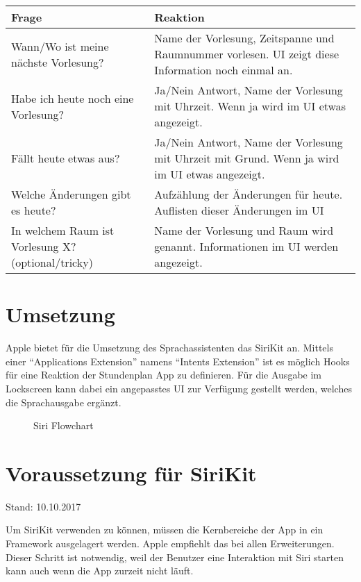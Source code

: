 \noindent%
\begin{tabularx}{\textwidth}{|p{}|X| }
\hline
\textbf{Frage} & \textbf{Reaktion}  \\ \hline 

Wann/Wo ist meine nächste Vorlesung? & Name der Vorlesung, Zeitspanne und Raumnummer vorlesen.
UI zeigt diese Information noch einmal an.\\ \hline

Habe ich heute noch eine Vorlesung? & Ja/Nein Antwort, Name der Vorlesung mit Uhrzeit. 
Wenn ja wird im UI etwas angezeigt.
\\ \hline

Fällt heute etwas aus? & Ja/Nein Antwort, Name der Vorlesung mit Uhrzeit mit Grund. 
Wenn ja wird im UI etwas angezeigt.\\ \hline
Welche Änderungen gibt es heute? & Aufzählung der Änderungen für heute.
Auflisten dieser Änderungen im UI\\ \hline
In welchem Raum ist Vorlesung X? (optional/tricky) & Name der Vorlesung und Raum wird genannt.
Informationen im UI werden angezeigt.
\\ \hline

\end{tabularx}

\section{Umsetzung}
Apple bietet für die Umsetzung des Sprachassistenten das SiriKit an. Mittels einer “Applications Extension” namens “Intents Extension” ist es möglich Hooks für eine Reaktion der Stundenplan App zu definieren. Für die Ausgabe im Lockscreen kann dabei ein angepasstes UI zur Verfügung gestellt werden, welches die Sprachausgabe ergänzt.
\newline


\begin{figure}[ht]
	\centering
	\caption{Siri Flowchart}
	\label{flowchart}
\end{figure}


\section{Voraussetzung für SiriKit}

Stand: 10.10.2017

Um SiriKit verwenden zu können, müssen die Kernbereiche der App in ein Framework ausgelagert werden. 
Apple empfiehlt das bei allen Erweiterungen.  Dieser Schritt ist notwendig, weil der Benutzer eine Interaktion mit Siri starten kann auch wenn die App zurzeit nicht läuft.  




